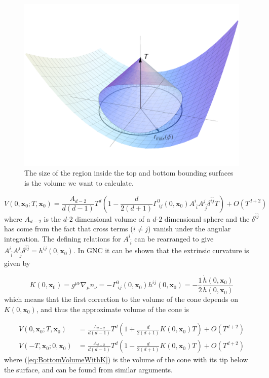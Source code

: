 \documentclass[12pt]{article}
\newcommand{\be}{\begin{equation}}
\newcommand{\ee}{\end{equation}}
\begin{document}
\begin{figure}
  \centering
    \includegraphics[scale=0.6]{coneplot}
     \caption{The size of the region inside the top and bottom bounding surfaces is the volume we want to calculate.}
     \label{fig:cone_plot}
\end{figure}

\be\label{eq:VolumeNoK}
V(0,\mathbf{x}_0;T,\mathbf{x}_0)
=\frac{A_{d-2}}{d(d-1)}T^d\left(1-\frac{d}{2(d+1)}\Gamma^{0}_{\;ij}(0,\mathbf{x}_0)A^{i}_{\;\overline{i}}A^{j}_{\;\overline{j}}\delta^{\overline{i}\overline{j}}T\right)
+O(T^{d+2})
\ee
where $A_{d-2}$ is the $d$-$2$ dimensional volume of a $d$-$2$ dimensional sphere and the $\delta^{\overline{i}\overline{j}}$ has come from the fact that cross terms ($\overline{i}\neq \overline{j}$) vanish under the angular integration. The defining relations for $A^{i}_{\;\overline{i}}$ can be rearranged to give $A^{i}_{\;\overline{i}}A^{j}_{\;\overline{j}}\delta^{\overline{i}\overline{j}}=h^{ij}(0,\mathbf{x}_0)$. In GNC it can be shown that the extrinsic curvature is given by

\be\label{eq:K}
K(0,\mathbf{x}_0)
=g^{\mu\nu }\nabla_{\mu}n_{\nu}
=-\Gamma^{0}_{\;ij}(0,\mathbf{x}_0)h^{ij}(0,\mathbf{x}_0)=-\frac{1}{2}\frac{\dot{h}(0,\mathbf{x}_0)}{h(0,\mathbf{x}_0)}
\ee
which means that the first correction to the volume of the cone depends on $K(0,\mathbf{x}_0)$, and thus the approximate volume of the cone is

\begin{align}
V(0,\mathbf{x}_0;T,\mathbf{x}_0)
&=\frac{A_{d-2}}{d(d-1)}T^d\left(1+\frac{d}{2(d+1)}K(0,\mathbf{x}_0)T\right)
+O(T^{d+2}) \label{eq:TopVolumeWithK}\\
V(-T,\mathbf{x}_0;0,\mathbf{x}_0)
&=\frac{A_{d-2}}{d(d-1)}T^d\left(1-\frac{d}{2(d+1)}K(0,\mathbf{x}_0)T\right)
+O(T^{d+2}) \label{eq:BottomVolumeWithK}
\end{align}
where (\ref{eq:BottomVolumeWithK}) is the volume of the cone with its tip below the surface, and can be found from similar arguments.
\end{document}
